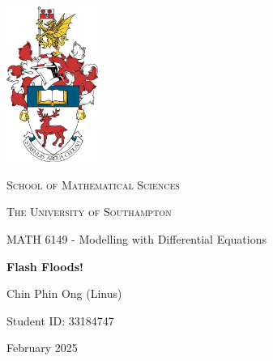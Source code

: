 \documentclass[12pt]{article}
\begin{document}
\onehalfspacing
\begin{titlepage}
    \centering
    \includegraphics[width=3cm]{crest.jpg}\par
    \vspace{0.3cm}
    {\scshape\Large School of Mathematical Sciences \par}
    \vspace{0.25cm}
    {\scshape\Large The University of Southampton \par}
    \vspace{0.25cm}
    {\Large MATH 6149 - Modelling with Differential Equations \par}
    \vspace{0.5cm}
    {\huge\bfseries Flash Floods!\par}
    \vspace{0.5cm}

    {\Large Chin Phin Ong (Linus) \par}
    \vspace{0.25cm}
    {\large Student ID: 33184747 \par}
    {\large  \par}
    \vfill
    {\large February 2025 \par}
\end{titlepage}

\begin{abstract}
    Flash floods are dangerous and unpredictable, caused by rapid flooding after intense rainfall, often within a few hours. In this study, we develop a mathematical model to describe flash flood dynamics using first-order hyperbolic PDEs based on mass and momentum conservation. We consider different river cross sections — rectangular, wedge-shaped, semicircular, and parabolic — and derive the corresponding perimeter and flux expressions. The formation and evolution of shocks are analysed using characteristic diagrams, providing insight into how rapid changes in flow develop. Numerical solutions are computed using Godunov's method, which effectively handles shock formation due to non-linear wave propagation. The model is tested under realistic rainfall conditions, showing how river geometry influences the behaviour of flood waves.
\end{abstract}
\end{document}
